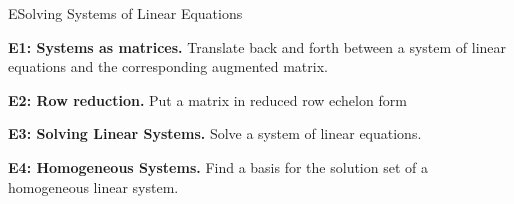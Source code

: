
\begin{module}{E}{Solving Systems of Linear Equations}

\begin{moduleStandards}
  \item \textbf{E1: Systems as matrices.}
        Translate back and forth between a system of linear equations and
        the corresponding augmented matrix.
  \item \textbf{E2: Row reduction.}
        Put a matrix in reduced row echelon form
  \item \textbf{E3: Solving Linear Systems.}
        Solve a system of linear equations.
  \item \textbf{E4: Homogeneous Systems.}
        Find a basis for the solution set of a homogeneous linear system.
\end{moduleStandards}






\end{module}
